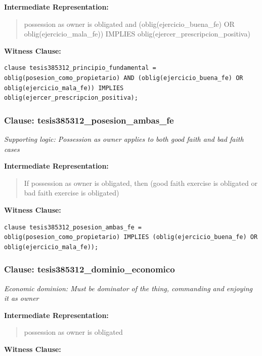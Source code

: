 \documentclass[11pt,a4paper]{article}
\begin{document}
\textbf{Intermediate Representation:}

\begin{quote}
possession as owner is obligated and (oblig(ejercicio\_buena\_fe) OR oblig(ejercicio\_mala\_fe)) IMPLIES oblig(ejercer\_prescripcion\_positiva)
\end{quote}

\textbf{Witness Clause:}

\begin{lstlisting}[style=witnessstyle, language=Witness]
clause tesis385312_principio_fundamental = oblig(posesion_como_propietario) AND (oblig(ejercicio_buena_fe) OR oblig(ejercicio_mala_fe)) IMPLIES oblig(ejercer_prescripcion_positiva);
\end{lstlisting}

\subsubsection{Clause: tesis385312\_posesion\_ambas\_fe}

\textit{Supporting logic: Possession as owner applies to both good faith and bad faith cases}

\textbf{Intermediate Representation:}

\begin{quote}
If possession as owner is obligated, then (good faith exercise is obligated or bad faith exercise is obligated)
\end{quote}

\textbf{Witness Clause:}

\begin{lstlisting}[style=witnessstyle, language=Witness]
clause tesis385312_posesion_ambas_fe = oblig(posesion_como_propietario) IMPLIES (oblig(ejercicio_buena_fe) OR oblig(ejercicio_mala_fe));
\end{lstlisting}

\subsubsection{Clause: tesis385312\_dominio\_economico}

\textit{Economic dominion: Must be dominator of the thing, commanding and enjoying it as owner}

\textbf{Intermediate Representation:}

\begin{quote}
possession as owner is obligated
\end{quote}

\textbf{Witness Clause:}
\end{document}
